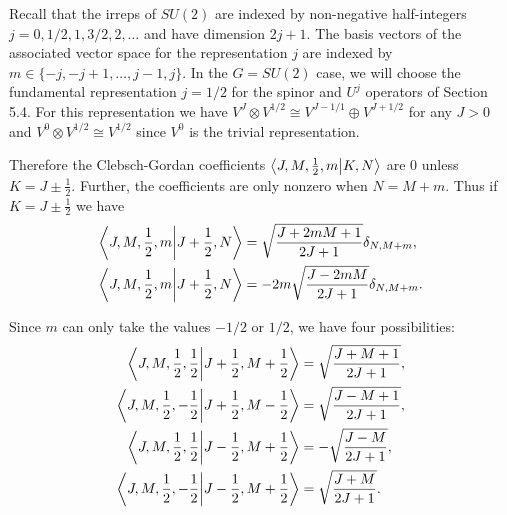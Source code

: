 \documentclass[10pt,reqno]{amsart}
\numberwithin{equation}{section}
\begin{document}
	Recall that the irreps of $SU(2)$ are indexed by non-negative half-integers $j=0,1/2,1,3/2,2,\ldots$ and have dimension $2j+1$.
	The basis vectors of the associated vector space for the representation $j$ are indexed by $m\in \{-j,-j+1,\ldots,j-1,j \}$.
	In the $G=SU(2)$ case, we will choose the fundamental representation $j=1/2$ for the spinor and $U^j$ operators of Section 5.4.
	For this representation we have $V^J \otimes V^{1/2} \cong V^{J-1/1}\oplus V^{J+1/2}$ for any $J>0$ and $V^0\otimes V^{1/2}\cong V^{1/2}$ since $V^0$ is the trivial representation.
	
	Therefore the Clebsch-Gordan coefficients $\braket{J,M,\frac{1}{2},m}{K,N}$ are $0$ unless $K=J\pm \frac{1}{2}$. 
	Further, the coefficients are only nonzero when $N=M+m$.
	Thus if $K=J\pm \frac{1}{2}$ we have 
	\begin{align}
		\braket{J,M,\frac{1}{2},m}{J+\frac{1}{2},N} &= \sqrt{\frac{J+2mM+1}{2J+1}} \delta_{N,M+m},\\
		 \braket{J,M,\frac{1}{2},m}{J+\frac{1}{2},N} &= -2m\sqrt{\frac{J-2mM}{2J+1}} \delta_{N,M+m}.
	\end{align}
	
	Since $m$ can only take the values $-1/2$ or $1/2$, we have four possibilities:	
	\begin{align}
		\braket{J,M,\frac{1}{2},\frac{1}{2}}{J+\frac{1}{2},M+\frac{1}{2}} &= \sqrt{\frac{J+M+1}{2J+1}} ,\\
		\braket{J,M,\frac{1}{2},-\frac{1}{2}}{J+\frac{1}{2},M-\frac{1}{2}} &= \sqrt{\frac{J-M+1}{2J+1}},\\
		\braket{J,M,\frac{1}{2},\frac{1}{2}}{J-\frac{1}{2},M+\frac{1}{2}} &= -\sqrt{\frac{J-M}{2J+1}},\\
		\braket{J,M,\frac{1}{2},-\frac{1}{2}}{J-\frac{1}{2},M+\frac{1}{2}} &= \sqrt{\frac{J+M}{2J+1}}.
	\end{align}
	
\end{document}
